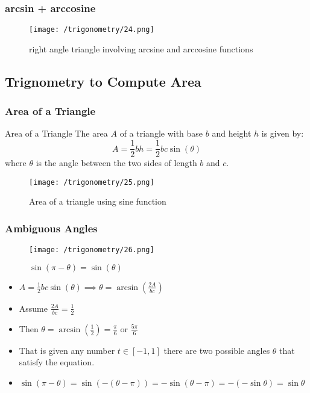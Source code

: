 \documentclass{beamer}
\begin{document}
\begin{frame}
    \frametitle{arcsin + arccosine}
    \begin{figure}
        \centering
        \texttt{[image: /trigonometry/24.png]}
        \caption{right angle triangle involving arcsine and arccosine functions}      
    \end{figure}
\end{frame}

\subsection{Trignometry to Compute Area}

\begin{frame}
    \frametitle{Area of a Triangle}
    \begin{block}{Area of a Triangle}
        The area \(A\) of a triangle with base \(b\) and height \(h\) is given by:
        \[
        A = \frac{1}{2} b h = \frac{1}{2} b c \sin(\theta)
        \]
        where \(\theta\) is the angle between the two sides of length \(b\) and \(c\).
    \end{block}
    \begin{figure}
        \centering
        \texttt{[image: /trigonometry/25.png]}
        \caption{Area of a triangle using sine function}
    \end{figure}
\end{frame}

\begin{frame}
    \frametitle{Ambiguous Angles}
    \begin{figure}
        \centering
        \texttt{[image: /trigonometry/26.png]}
        \caption{\(\sin(\pi - \theta) = \sin(\theta)\)}
    \end{figure}
    \begin{itemize}
        \item  \(A = \frac{1}{2} b c \sin(\theta) \implies \theta = \arcsin\left(\frac{2A}{bc}\right) \)
        \item Assume \( \frac{2A}{bc} = \frac{1}{2} \) 
        \item Then \( \theta = \arcsin\left(\frac{1}{2}\right) = \frac{\pi}{6} \) or \( \frac{5\pi}{6} \)
        \item That is given any number \(t \in [-1,1]\) there are two possible angles \(\theta\) that satisfy the equation.
        \item \(\sin (\pi - \theta) = \sin(-(\theta - \pi )) = - \sin(\theta - \pi) = -(-\sin \theta) = \sin \theta \)
    \end{itemize}
    \end{frame}
\end{document}

